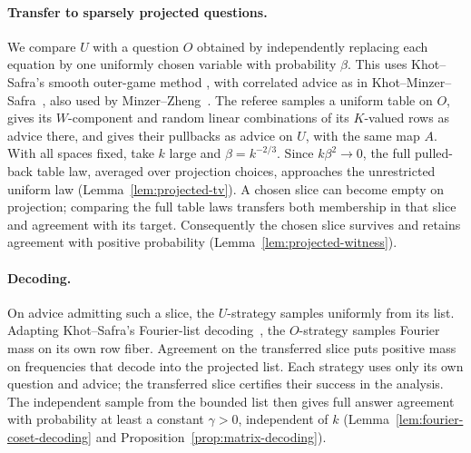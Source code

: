 \paragraph{Transfer to sparsely projected questions.}
We compare \(U\) with a question \(O\) obtained by independently
replacing each equation by one uniformly chosen variable with probability
\(\beta\). This uses Khot--Safra's smooth outer-game method
\cite[Section~3 and Lemma~3.1]{KS13}, with correlated advice as in
Khot--Minzer--Safra~\cite[Sections~3.3--3.4]{KMS17}, also used by
Minzer--Zheng~\cite[Section~3]{MZ26}. The referee samples a uniform
table on \(O\), gives its \(W\)-component and random linear combinations
of its \(K\)-valued rows as advice there, and gives their pullbacks as advice
on \(U\), with the same map \(A\). With all spaces fixed, take \(k\)
large and \(\beta=k^{-2/3}\). Since \(k\beta^2\to0\),
the full pulled-back table law, averaged over projection choices,
approaches the unrestricted uniform law
(Lemma~\ref{lem:projected-tv}). A chosen slice can become empty on
projection; comparing the full table laws transfers both membership in
that slice and agreement with its target. Consequently the chosen slice
survives and retains agreement with positive probability
(Lemma~\ref{lem:projected-witness}).

\paragraph{Decoding.}
On advice admitting such a slice, the \(U\)-strategy samples uniformly from its list. Adapting
Khot--Safra's Fourier-list decoding~\cite[Section~1.1]{KS13}, the
\(O\)-strategy samples Fourier mass on its own row fiber. Agreement on
the transferred slice puts positive mass on frequencies that decode into
the projected list. Each strategy uses only its own question and advice; the
transferred slice certifies their success in the analysis. The
independent sample from the bounded list then gives full answer agreement
with probability at least a constant \(\gamma>0\), independent of \(k\)
(Lemma~\ref{lem:fourier-coset-decoding} and
Proposition~\ref{prop:matrix-decoding}).


